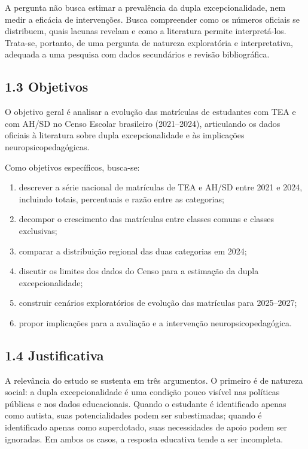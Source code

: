 A pergunta não busca estimar a prevalência da dupla excepcionalidade,
nem medir a eficácia de intervenções. Busca compreender como os números
oficiais se distribuem, quais lacunas revelam e como a literatura
permite interpretá-los. Trata-se, portanto, de uma pergunta de natureza
exploratória e interpretativa, adequada a uma pesquisa com dados
secundários e revisão bibliográfica.

\subsection{1.3 Objetivos}\label{objetivos}

O objetivo geral é analisar a evolução das matrículas de estudantes com
TEA e com AH/SD no Censo Escolar brasileiro (2021--2024), articulando os
dados oficiais à literatura sobre dupla excepcionalidade e às
implicações neuropsicopedagógicas.

Como objetivos específicos, busca-se:

\begin{enumerate}
\def\labelenumi{\alph{enumi})}
\item
  descrever a série nacional de matrículas de TEA e AH/SD entre 2021 e
  2024, incluindo totais, percentuais e razão entre as categorias;
\item
  decompor o crescimento das matrículas entre classes comuns e classes
  exclusivas;
\item
  comparar a distribuição regional das duas categorias em 2024;
\item
  discutir os limites dos dados do Censo para a estimação da dupla
  excepcionalidade;
\item
  construir cenários exploratórios de evolução das matrículas para
  2025--2027;
\item
  propor implicações para a avaliação e a intervenção
  neuropsicopedagógica.
\end{enumerate}

\subsection{1.4 Justificativa}\label{justificativa}

A relevância do estudo se sustenta em três argumentos. O primeiro é de
natureza social: a dupla excepcionalidade é uma condição pouco visível
nas políticas públicas e nos dados educacionais. Quando o estudante é
identificado apenas como autista, suas potencialidades podem ser
subestimadas; quando é identificado apenas como superdotado, suas
necessidades de apoio podem ser ignoradas. Em ambos os casos, a resposta
educativa tende a ser incompleta.

